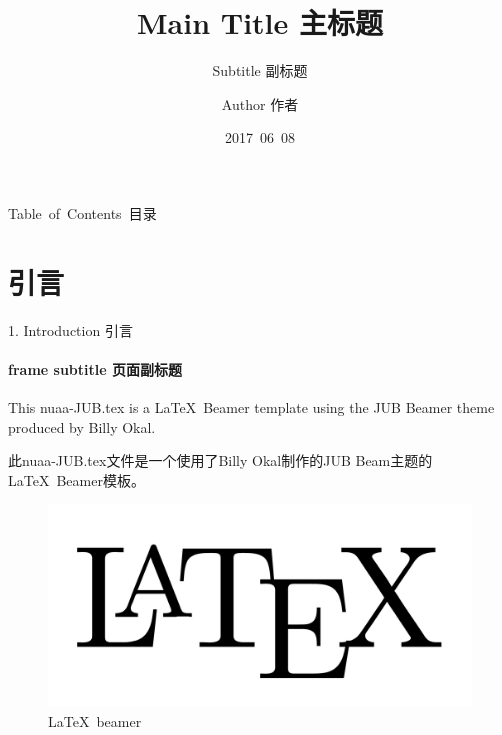 \documentclass[CJKutf8]{beamer}
\begin{document}
\begin{CJK*}{UTF8}{gbsn} %

  \title{Main Title 主标题}
  \subtitle{Subtitle 副标题} %
  \author{Author 作者}
  \date{2017\ 06\ 08}

  \begin{frame}[plain,t]
    \titlepage
  \end{frame} %
  
  \begin{frame}{Table\ of\ Contents\ 目录}
    \tableofcontents
  \end{frame}
  
  \section{引言}
  \label{Sec:introduction}
  \begin{frame}{1. Introduction 引言}
    \framesubtitle{frame subtitle 页面副标题}
    This nuaa-JUB.tex is a \LaTeX \ Beamer template using the JUB Beamer theme \cite{JUBTheme} produced by Billy Okal.

    \bigskip

    此nuaa-JUB.tex文件是一个使用了Billy Okal制作的JUB Beam主题\cite{JUBTheme}的\LaTeX \ Beamer模板。

    \begin{figure}
      \begin{center}
        \includegraphics[scale=0.1]{latex.png}
      \end{center}
      \caption{\LaTeX \ beamer}
      \label{Fig:latex_beamer}
    \end{figure}
  \end{frame}


\end{CJK*}
\end{document}
